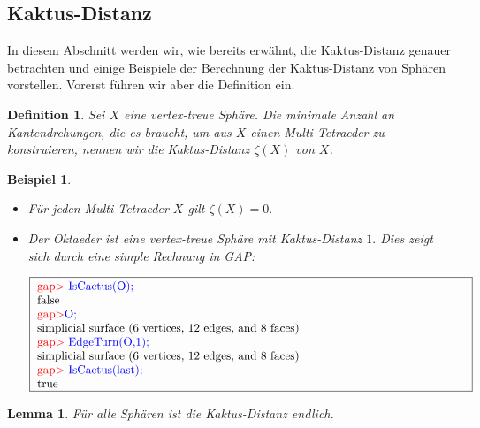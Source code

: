 \documentclass[12pt,titlepage,twoside,cleardoublepage]{article}
\theoremstyle{nummermitklammern}
\newtheorem{lemma}[temp]{Lemma}
\newtheorem{bsp}[temp]{Beispiel}
\newtheorem{definition}[temp]{Definition}
\newtheorem{definition}[zahl]{Definition}
\newtheorem{lemma}[zahl]{Lemma}
\newtheorem{bsp}[zahl]{Beispiel}
\numberwithin{equation}{section}
\begin{document}
\subsection{Kaktus-Distanz}
In diesem Abschnitt werden wir, wie bereits erwähnt, die Kaktus-Distanz genauer betrachten und einige Beispiele der Berechnung der Kaktus-Distanz von Sphären vorstellen.
Vorerst führen wir aber die Definition ein.
\begin{definition}
Sei $X$ eine vertex-treue Sphäre. Die minimale Anzahl an Kantendrehungen, die es braucht, um aus $X$ einen Multi-Tetraeder zu  konstruieren, nennen wir die \emph{Kaktus-Distanz} $\zeta(X)$ von $X$.
\end{definition}
\begin{bsp}
\begin{itemize}
\item Für jeden Multi-Tetraeder $X$ gilt $\zeta(X)=0.$
\item Der Oktaeder ist eine vertex-treue Sphäre mit Kaktus-Distanz $1.$ Dies zeigt sich durch eine simple Rechnung in GAP:
\begin{center}
$\fbox{
\parbox{13cm}{
\textcolor{red}{gap$>$} \textcolor{blue}{IsCactus(O);}\\
false\\
\textcolor{red}{gap$>$}\textcolor{blue}{ O;}\\
simplicial surface (6 vertices, 12 edges, and 8 faces)\\
\textcolor{red}{gap$>$} \textcolor{blue}{EdgeTurn(O,1);}\\
simplicial surface (6 vertices, 12 edges, and 8 faces)\\
\textcolor{red}{gap$>$} \textcolor{blue}{IsCactus(last);}\\
true
}}$
\end{center}
\end{itemize}
\end{bsp}
\begin{lemma}
Für alle Sphären ist die Kaktus-Distanz endlich.
\end{lemma}
\end{document}
